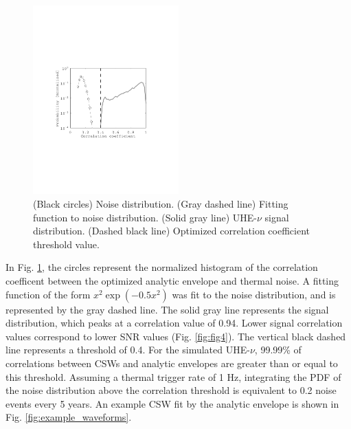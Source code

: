 \documentclass[amsmath,amssymb,aps,prd,10pt,twocolumn,showkeys]{revtex4}
\begin{document}
\begin{itemize}
\begin{figure}
\centering
\includegraphics[width=0.5\textwidth,trim=3.25cm 8.25cm 4.5cm 9.0cm,clip=true]{Aug15_plot1.pdf}
\caption{\label{fig:fig3} (Black circles) Noise distribution. (Gray dashed line) Fitting function to noise distribution.  (Solid gray line) UHE-$\nu$ signal distribution.  (Dashed black line) Optimized correlation coefficient threshold value.}
\end{figure}

In Fig. \ref{fig:fig3}, the circles represent the normalized histogram of the correlation coefficent between the optimized analytic envelope and thermal noise.  A fitting function of the form $x^2 \exp(-0.5 x^2)$ was fit to the noise distribution, and is represented by the gray dashed line.  The solid gray line represents the signal distribution, which peaks at a correlation value of 0.94.  Lower signal correlation values correspond to lower SNR values (Fig. \ref{fig:fig4}).  The vertical black dashed line represents a threshold of 0.4.  For the simulated UHE-$\nu$, 99.99\% of correlations between CSWs and analytic envelopes are greater than or equal to this threshold.  Assuming a thermal trigger rate of 1 Hz, integrating the PDF of the noise distribution above the correlation threshold is equivalent to 0.2 noise events every 5 years.  An example CSW fit by the analytic envelope is shown in Fig. \ref{fig:example_waveforms}.


\end{itemize}
\end{document}
